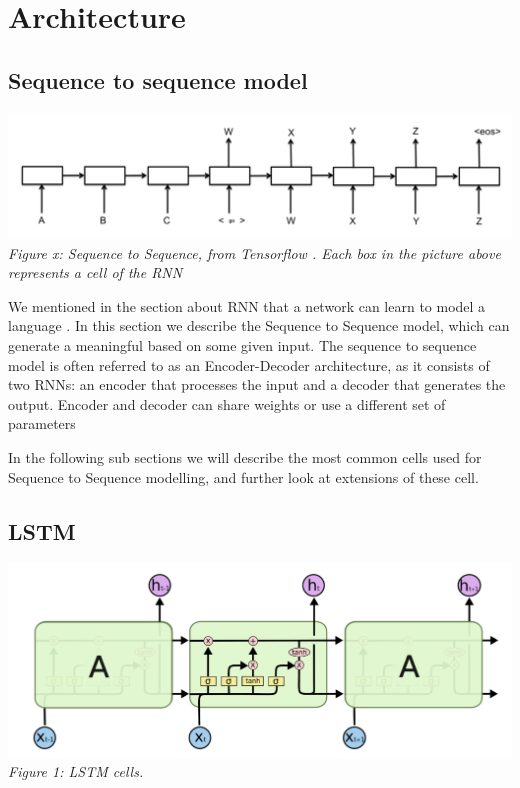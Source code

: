 \documentclass{article} %
\begin{document}
\section{Architecture}

\subsection{Sequence to sequence model}
\includegraphics[scale=0.5]{seq2seq} \newline
\textit{Figure x: Sequence to Sequence, from Tensorflow \cite{seq2seq}. Each box in the picture above represents a cell of the RNN } \newline

We mentioned in the section about RNN that a network can learn to model a language . In this section we describe the Sequence to Sequence model, which can generate a meaningful based on some given input. The sequence to sequence model is often referred to as an Encoder-Decoder architecture, as it consists of two RNNs: an encoder that processes the input and a decoder that generates the output. Encoder and decoder can share weights or use a different set of parameters

In the following sub sections we will describe the most common cells used for Sequence to Sequence modelling, and further look at extensions of these cell. 

\subsection{LSTM}
\includegraphics[scale=0.5]{lstm_cells} \newline
\textit{Figure 1: LSTM cells.  } \newline
\end{document}
